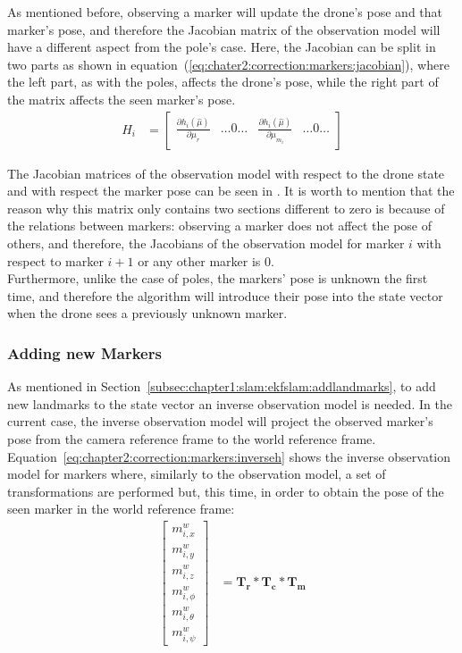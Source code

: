 As mentioned before, observing a marker will update the drone's pose and that marker's pose, and therefore the Jacobian matrix of the observation model will have a different aspect from the pole's case. Here, the Jacobian can be split in two parts as shown in equation~(\ref{eq:chater2:correction:markers:jacobian}), where the left part, as with the poles, affects the drone's pose, while the right part of the matrix affects the seen marker's pose.
\begin{align}
    H_i &= \begin{bmatrix}
        \frac{\partial h_i(\hat\mu)}{\partial \mu_r} & \dots0\dots & \frac{\partial h_i(\hat\mu)}{\partial \mu_{m_i}} & \dots0\dots
    \end{bmatrix}
    \label{eq:chater2:correction:markers:jacobian}
\end{align}

The Jacobian matrices of the observation model with respect to the drone state and with respect the marker pose can be seen in \cite{polibri-github}. It is worth to mention that the reason why this matrix only contains two sections different to zero is because of the relations between markers: observing a marker does not affect the pose of others, and therefore, the Jacobians of the observation model for marker $i$ with respect to marker $i+1$ or any other marker is 0.\\

Furthermore, unlike the case of poles, the markers' pose is unknown the first time, and therefore the algorithm will introduce their pose into the state vector when the drone sees a previously unknown marker.

\subsubsection{Adding new Markers}
\label{subsubsec:chapter2:correction:markers:add}
As mentioned in Section~\ref{subsec:chapter1:slam:ekfslam:addlandmarks}, to add new landmarks to the state vector an inverse observation model is needed. In the current case, the inverse observation model will project the observed marker's pose from the camera reference frame to the world reference frame. Equation~\ref{eq:chapter2:correction:markers:inverseh} shows the inverse observation model for markers where, similarly to the observation model, a set of transformations are performed but, this time, in order to obtain the pose of the seen marker in the world reference frame:
\begin{align}
    \begin{bmatrix}
        m_{i, x}^w \\ m_{i, y}^w \\ m_{i, z}^w \\ m_{i, \phi}^w \\ m_{i, \theta}^w \\ m_{i, \psi}^w
    \end{bmatrix} &= \bm{T_r} * \bm{T_c} * \bm{T_m}
    \label{eq:chapter2:correction:markers:inverseh}
\end{align}

